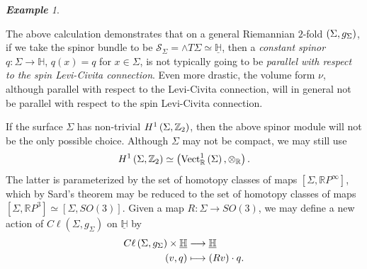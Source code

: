 \documentclass[openany, 11pt]{article}
\theoremstyle{definition}
\theoremstyle{remark}
\newtheorem*{example*}{\textbf{Example}}
\def\lp{\ensuremath{\left(}}
\def\rp{\ensuremath{\right)}}
\def\Sc{\ensuremath{\mathscr{S}}}
\def\bH{\ensuremath{\mathbb{H}}}
\def\bR{\ensuremath{\mathbb{R}}}
\def\bZ{\ensuremath{\mathbb{Z}}}
\def\bS{\ensuremath{\mathbb{S}}}
\begin{document}
\begin{example*}
\end{example*}
The above calculation demonstrates that on a general Riemannian $2$-fold $\lp \Sigma,g_{\Sigma}\rp$, if we take the spinor bundle to be $\Sc_{\Sigma}=\wedge T\Sigma\simeq \underline{\bH}$, then a \emph{constant spinor} $q:\Sigma\rightarrow \bH$, $q(x)=q$ for $x\in\Sigma$, is not typically going to be \emph{parallel with respect to the spin Levi-Civita connection}. Even more drastic, the volume form $\nu$, although parallel with respect to the Levi-Civita connection, will in general not be parallel with respect to the spin Levi-Civita connection.\par
If the surface $\Sigma$ has non-trivial $H^1\lp\Sigma,\bZ_2\rp$, then the above spinor module will not be the only possible choice. Although $\Sigma$ may not be compact, we may still use 
\[
    H^1\lp\Sigma,\bZ_2\rp\simeq \lp \text{Vect}^1_{\bR}\lp\Sigma\rp,\otimes_{\bR}\rp.
\]
The latter is parameterized by the set of homotopy classes of maps $[\Sigma,\bR P^{\infty}]$, which by Sard's theorem may be reduced to the set of homotopy classes of maps $[\Sigma,\bR P^3]\simeq[\Sigma,SO(3)]$. Given a map $R:\Sigma\rightarrow SO(3)$, we may define a new action of $C\ell(\Sigma,g_{\Sigma})$ on $\underline{\bH}$ by
\begin{align*}
    C\ell\lp\Sigma,g_{\Sigma}\rp\times\underline{\bH}&\longrightarrow\underline{\bH}\\
    (v,q)&\longmapsto \lp Rv\rp\cdot q.
\end{align*}
\end{document}
